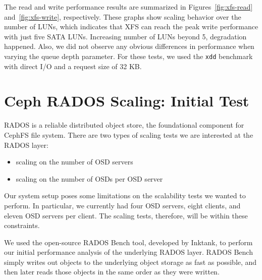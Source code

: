 \documentclass{article}
\begin{document}




The read and write performance results are summarized in
Figures~\ref{fig:xfs-read} and~\ref{fig:xfs-write}, respectively. These graphs
show scaling behavior over the number of LUNs, which indicates that XFS can
reach the peak write performance with just five SATA LUNs. Increasing number
of LUNs beyond 5, degradation happened.  Also, we did not observe any obvious
differences in performance when varying the queue depth parameter.  For these
tests, we used the \verb!xdd! benchmark with direct I/O and a request size of
32 KB.


\section{Ceph RADOS Scaling: Initial Test}

RADOS is a reliable distributed object store, the foundational component for
CephFS file system. There are two types of scaling tests we are interested at
the RADOS layer:

\begin{itemize}
  \item scaling on the number of OSD servers
  \item scaling on the number of OSDs per OSD server
\end{itemize}

Our system setup poses some limitations on the scalability tests we wanted to
perform. In particular, we currently had four OSD servers, eight clients, and
eleven OSD servers per client. The scaling tests, therefore, will be within
these constraints.

We used the open-source RADOS Bench tool, developed by Inktank, to perform our
initial performance analysis of the underlying RADOS layer.  RADOS Bench simply
writes out objects to the underlying object storage as fast as possible, and
then later reads those objects in the same order as they were written.
\end{document}
